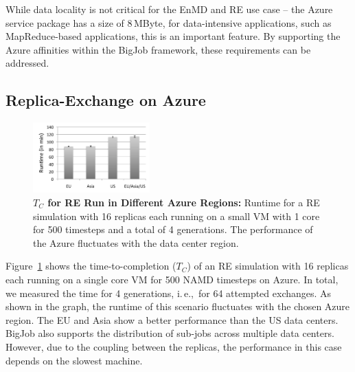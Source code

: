 \documentclass[conference,final]{IEEEtran}
\newcommand{\up}{\vspace*{-1em}}
\newcommand{\tc}{$T_{C}$ }
\newcommand{\tcnsp}{$T_{C}$}
\newcommand{\jhanote}[1]{ {\textcolor{red} { ***SJ: #1 }}}
\newcommand{\jhanote}[1]{}
\begin{document}

While data locality is not critical for the EnMD and RE use case --
the Azure service package has a size of 8\,MByte, for data-intensive
applications, such as MapReduce-based applications, this is an
important feature. By supporting the Azure affinities within the
BigJob framework, these requirements can be addressed.  \up

\subsection{Replica-Exchange on Azure}
\up
\begin{figure}[t]
    \centering
        \includegraphics[width=0.4\textwidth]{performance/repex_runtime_per_region.pdf}
        \up
        \caption{\textbf{\tc for RE Run in Different Azure Regions:}
          Runtime for a RE simulation with 16 replicas each running on
          a small VM with 1 core for 500 timesteps and a total of 4
          generations. The performance of the Azure fluctuates with
          the data center region.}
    \label{fig:performance_repex_runtime_per_region}
    \up
\end{figure}

Figure~\ref{fig:performance_repex_runtime_per_region} shows the
time-to-completion (\tcnsp) of an RE simulation with 16 replicas each
running on a single core VM for 500 NAMD timesteps on Azure. In total,
we measured the time for 4 generations, i.\,e.,\ for 64 attempted
exchanges. As shown in the graph, the runtime of this scenario fluctuates
with the chosen Azure region. The EU and Asia show a better
performance than the US data centers. BigJob also supports the
distribution of sub-jobs across multiple data centers. However, due to
the coupling between the replicas, the performance in this case
depends on the slowest machine.
\end{document}
